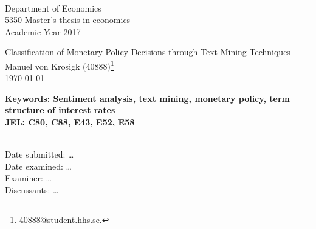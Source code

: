 
	\\
	Department of Economics\\
	5350 Master’s thesis in economics\\
	Academic Year 2017\\

	\vspace{1cm}	
	\begin{centering}
		\Large{Classification of Monetary Policy Decisions through Text Mining Techniques}\\
		\vspace{.5cm}	
		\large{Manuel von Krosigk (40888)}\footnote{\href{mailto:40888@student.hhs.se}{40888@student.hhs.se.}}\\
		\vspace{.5cm}	
		\large{\today}\\
	\end{centering}	
	\begin{abstract}
		\dots
	\end{abstract}
	\textbf{Keywords: Sentiment analysis, text mining, monetary policy, term structure of interest rates}
	\\\textbf{JEL: C80, C88, E43, E52, E58} %
	
	\vfill
	\\Date submitted: \dots
	\\Date examined: \dots
	\\Examiner: \dots
	\\Discussants: \dots